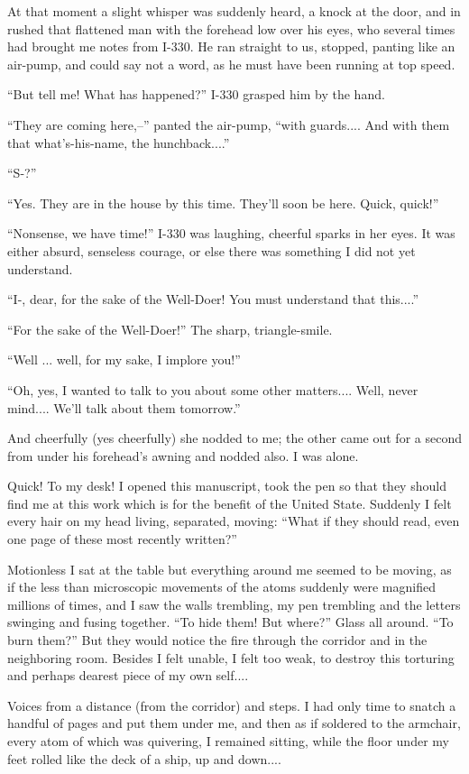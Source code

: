 \documentclass[11pt,openany]{book}
\begin{document}
At that moment a slight whisper was suddenly heard, a knock at the door, and in rushed that flattened man with the forehead low over his eyes, who several times had brought me notes from I-330. He ran straight to us, stopped, panting like an air-pump, and could say not a word, as he must have been running at top speed.

``But tell me! What has happened?'' I-330 grasped him by the hand.

``They are coming here,--'' panted the air-pump, ``with guards.... And with them that what's-his-name, the hunchback....''

``S-?''

``Yes. They are in the house by this time. They'll soon be here. Quick, quick!''

``Nonsense, we have time!'' I-330 was laughing, cheerful sparks in her eyes. It was either absurd, senseless courage, or else there was something I did not yet understand.

``I-, dear, for the sake of the Well-Doer! You must understand that this....''

``For the sake of the Well-Doer!'' The sharp, triangle-smile.

``Well ... well, for my sake, I implore you!''

``Oh, yes, I wanted to talk to you about some other matters.... Well, never mind.... We'll talk about them tomorrow.''

And cheerfully (yes cheerfully) she nodded to me; the other came out for a second from under his forehead's awning and nodded also. I was alone.

Quick! To my desk! I opened this manuscript, took the pen so that they should find me at this work which is for the benefit of the United State. Suddenly I felt every hair on my head living, separated, moving: ``What if they should read, even one page of these most recently written?''

Motionless I sat at the table but everything around me seemed to be moving, as if the less than microscopic movements of the atoms suddenly were magnified millions of times, and I saw the walls trembling, my pen trembling and the letters swinging and fusing together. ``To hide them! But where?'' Glass all around. ``To burn them?'' But they would notice the fire through the corridor and in the neighboring room. Besides I felt unable, I felt too weak, to destroy this torturing and perhaps dearest piece of my own self....

Voices from a distance (from the corridor) and steps. I had only time to snatch a handful of pages and put them under me, and then as if soldered to the armchair, every atom of which was quivering, I remained sitting, while the floor under my feet rolled like the deck of a ship, up and down....
\end{document}

